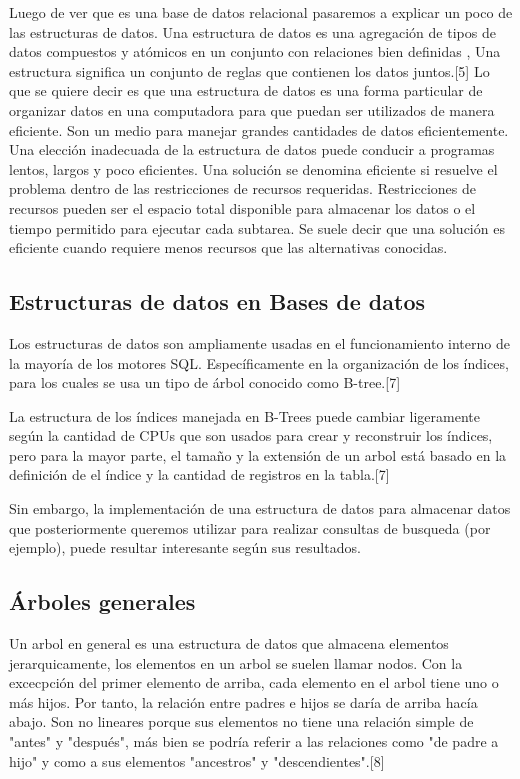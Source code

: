 \documentclass[twoside,twocolumn]{article}
\begin{document}
Luego de ver que es una base de datos relacional pasaremos a explicar un poco de las estructuras de datos.
Una estructura de datos  es una  agregación  de tipos  de datos  compuestos  y atómicos  en un conjunto  con relaciones  bien definidas , Una estructura  significa  un conjunto  de reglas  que contienen los datos  juntos.[5]
Lo que se quiere decir es 	que una estructura de datos es una forma particular de organizar datos en una computadora para que puedan ser utilizados de manera eficiente. Son un medio para manejar grandes cantidades de datos eficientemente.
Una elección inadecuada de la estructura de datos puede conducir a programas lentos, largos y poco eficientes.
Una solución se denomina eficiente si resuelve el problema dentro de las restricciones de recursos requeridas. Restricciones de recursos pueden ser el espacio total disponible para almacenar los datos o el tiempo permitido para ejecutar cada subtarea. Se suele decir que una solución es eficiente cuando requiere menos recursos que las alternativas conocidas.

\subsection{Estructuras de datos en Bases de datos}
Los estructuras de datos son ampliamente usadas en el funcionamiento interno de la mayoría de los motores SQL. Específicamente en la organización de los índices, para los cuales se usa un tipo de árbol conocido como B-tree.[7]


La estructura de los índices manejada en B-Trees puede cambiar ligeramente según la cantidad de CPUs que son usados para crear y reconstruir los índices, pero para la mayor parte, el tamaño y la extensión de un arbol está basado en la definición de el índice y la cantidad de registros en la tabla.[7]


Sin embargo, la implementación de una estructura de datos para almacenar datos que posteriormente queremos utilizar para realizar consultas de busqueda (por ejemplo), puede resultar interesante según sus resultados.

\subsection{Árboles generales}
Un arbol en general es una estructura de datos que almacena elementos jerarquicamente, los elementos en un arbol se suelen llamar nodos. Con la excecpción del primer elemento de arriba, cada elemento en el arbol tiene uno o más hijos. Por tanto, la relación entre padres e hijos se daría de arriba hacía abajo. Son no lineares porque sus elementos no tiene una relación simple de "antes" y "después", más bien se podría referir a las relaciones como "de padre a hijo" y como a sus elementos "ancestros" y "descendientes".[8]
\end{document}
